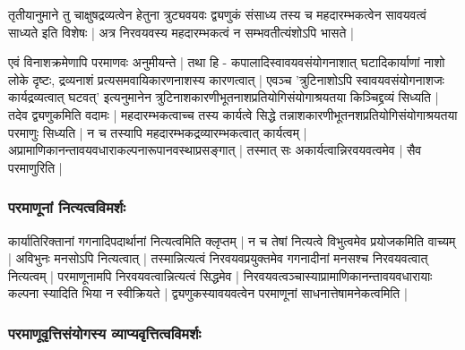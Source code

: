 तृतीयानुमाने तु चाक्षुषद्रव्यत्वेन हेतुना त्रुट्यवयवः द्व्यणुकं संसाध्य तस्य च महदारम्भकत्वेन सावयवत्वं साध्यते इति विशेषः | अत्र निरवयवस्य महदारम्भकत्वं न सम्भवतीत्यंशोऽपि भासते |

एवं विनाशक्रमेणापि परमाणवः अनुमीयन्ते | तथा हि - कपालादिस्वावयवसंयोगनाशात् घटादिकार्याणां नाशो लोके दृष्टः, द्रव्यनाशं प्रत्यसमवायिकारणनाशस्य कारणत्वात् | एवञ्च 'त्रुटिनाशोऽपि स्वावयवसंयोगनाशजः कार्यद्रव्यत्वात् घटवत्' इत्यनुमानेन त्रुटिनाशकारणीभूतनाशप्रतियोगिसंयोगाश्रयतया किञ्चिद्द्रव्यं सिध्यति | तदेव द्व्यणुकमिति वदामः | महदारम्भकत्वाच्च तस्य कार्यत्वे सिद्धे तन्नाशकारणीभूतनशप्रतियोगिसंयोगाश्रयतया परमाणुः सिध्यति | न च तस्यापि महदारम्भकद्रव्यारम्भकत्वात् कार्यत्वम् | अप्रामाणिकानन्तावयवधाराकल्पनारूपानवस्थाप्रसङ्गात् | तस्मात् सः अकार्यत्वान्निरवयवत्वमेव | सैव परमाणुरिति |

\subsubsection{परमाणूनां नित्यत्वविमर्शः}

कार्यातिरिक्तानां गगनादिपदार्थानां नित्यत्वमिति क्लृप्तम् | न च तेषां नित्यत्वे विभुत्वमेव प्रयोजकमिति वाच्यम् | अविभुनः मनसोऽपि नित्यत्वात् | तस्मान्नित्यत्वं निरवयवप्रयुक्तमेव गगनादीनां मनसश्च निरवयवत्वात् नित्यत्वम् | परमाणूनामपि निरवयवत्वान्नित्यत्वं सिद्धमेव | निरवयवत्वञ्चास्याप्रामाणिकानन्तावयवधारायाः कल्पना स्यादिति भिया न स्वीक्रियते |  द्व्यणुकस्यावयवत्वेन परमाणूनां साधनात्तेषामनेकत्वमिति | 

\subsubsection{परमाणूवृत्तिसंयोगस्य व्याप्यवृत्तित्वविमर्शः}

